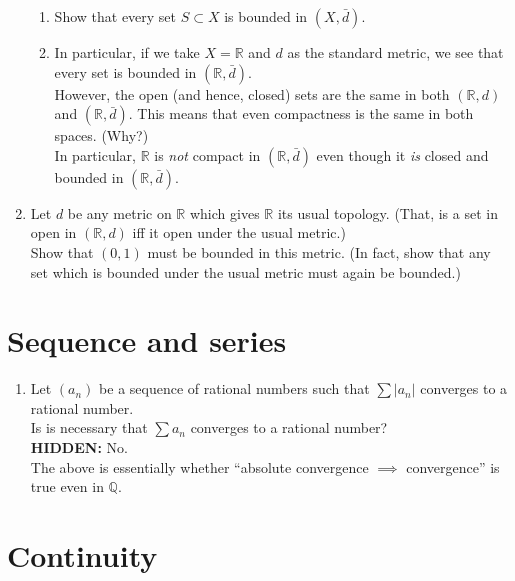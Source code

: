 \documentclass[12pt]{article}
\theoremstyle{definition}
\numberwithin{thm}{section}
\newcommand{\hint}[1]{\textbf{HIDDEN:} {\color[rgb]{0.95, 0.95, 0.95}#1}}
\begin{document}
\begin{enumerate}
\begin{enumerate}
		\item Show that every set $S \subset X$ is bounded in $(X, \bar{d}).$
		\item In particular, if we take $X = \mathbb{R}$ and $d$ as the standard metric, we see that every set is bounded in $(\mathbb{R}, \bar{d}).$\\
		However, the open (and hence, closed) sets are the same in both $(\mathbb{R}, d)$ and $(\mathbb{R}, \bar{d}).$ This means that even compactness is the same in both spaces. (Why?)\\
		In particular, $\mathbb{R}$ is \emph{not} compact in $(\mathbb{R}, \bar{d})$ even though it \emph{is} closed and bounded in $(\mathbb{R}, \bar{d}).$
	\end{enumerate}
	\item Let $d$ be any metric on $\mathbb{R}$ which gives $\mathbb{R}$ its usual topology. (That, is a set in open in $(\mathbb{R}, d)$ iff it open under the usual metric.)\\
	Show that $(0, 1)$ must be bounded in this metric. (In fact, show that any set which is bounded under the usual metric must again be bounded.)
\end{enumerate}
\newpage\section{Sequence and series}
\begin{enumerate}
	\item Let $(a_n)$ be a sequence of rational numbers such that $\sum |a_n|$ converges to a rational number.\\
	Is is necessary that $\sum a_n$ converges to a rational number?\\
	\hint{No.}\\
	The above is essentially whether ``absolute convergence $\implies$ convergence'' is true even in $\mathbb{Q}.$
\end{enumerate}
\newpage\section{Continuity}\label{sec:continuity}
\end{document}
